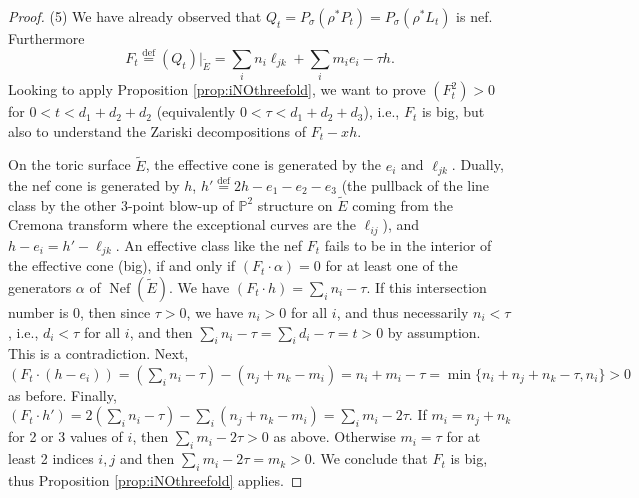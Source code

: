 \documentclass[12pt]{amsart}
\theoremstyle{definition}
\newcommand{\bb}{\ensuremath{\mathfrak{b}}}
\renewcommand{\geq}{\geqslant}
\DeclareMathOperator{\Nef}{Nef}
\newcommand{\deq}{\ensuremath{\stackrel{\textrm{def}}{=}}}
\newcommand{\?}{ \circled{{\large\bf ?}}}
\let\bb\mathbb
\begin{document}
\begin{proof}
	 (5) We have already observed that $Q_t=P_{\sigma}(\rho^*P_t)=P_{\sigma}(\rho^*L_t)$ is nef. Furthermore \[F_t\deq (Q_t)|_{\widetilde E}=\sum_in_i\ell_{jk}+\sum_im_ie_i-\tau h.\]
	Looking to apply Proposition \ref{prop:iNOthreefold}, we want to prove $(F_t^2)>0$ for $0<t<d_1+d_2+d_2$ (equivalently $0<\tau<d_1+d_2+d_3$), i.e., $F_t$ is big, but also to understand the Zariski decompositions of $F_t-xh$.
	
	On the toric surface $\widetilde E$, the effective cone is generated by the $e_i$ and $\ell_{jk}$. Dually, the nef cone is generated by $h$, $h'\deq 2h-e_1-e_2-e_3$ (the pullback of the line class by the other 3-point blow-up of $\bb P^2$ structure on $\widetilde E$ coming from the Cremona transform where the exceptional curves are the $\ell_{ij}$), and $h-e_i=h'-\ell_{jk}$. An effective class like the nef $F_t$ fails to be in the interior of the effective cone (big), if and only if $(F_t\cdot \alpha)=0$ for at least one of the generators $\alpha$ of $\Nef(\widetilde E)$. We have $(F_t\cdot h)=\sum_in_i-\tau$. If this intersection number is 0, then since $\tau>0$, we have $n_i>0$ for all $i$, and thus necessarily $n_i<\tau$, i.e., $d_i<\tau$ for all $i$, and then $\sum_in_i-\tau=\sum_id_i-\tau=t>0$ by assumption. This is a contradiction. Next, $(F_t\cdot (h-e_i))=(\sum_in_i-\tau)-(n_j+n_k-m_i)=n_i+m_i-\tau=\min\{n_i+n_j+n_k-\tau,n_i\}>0$ as before. Finally, $(F_t\cdot h')=2(\sum_in_i-\tau)-\sum_i(n_j+n_k-m_i)=\sum_im_i-2\tau$. If $m_i=n_j+n_k$ for 2 or 3 values of $i$, then $\sum_im_i-2\tau>0$ as above. Otherwise $m_i=\tau$ for at least 2 indices $i,j$ and then $\sum_im_i-2\tau=m_k>0$. We conclude that $F_t$ is big, thus Proposition \ref{prop:iNOthreefold} applies. 
	
	
	

\end{proof}
\end{document}
